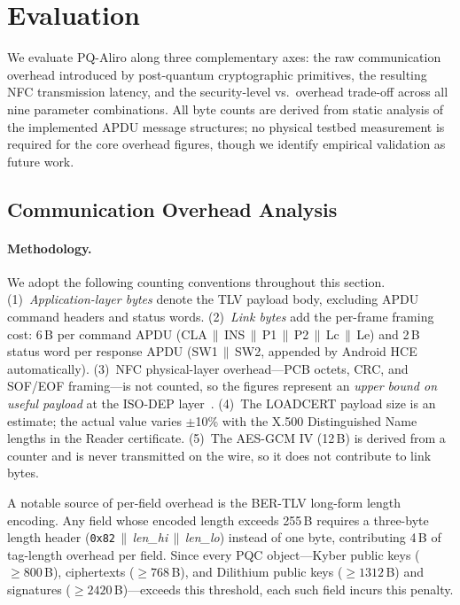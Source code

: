 \section{Evaluation}
\label{sec:evaluation}

We evaluate PQ-Aliro along three complementary axes: the raw communication
overhead introduced by post-quantum cryptographic primitives, the resulting
NFC transmission latency, and the security-level vs.\ overhead trade-off
across all nine parameter combinations.  All byte counts are derived from
static analysis of the implemented APDU message structures; no physical
testbed measurement is required for the core overhead figures, though we
identify empirical validation as future work.

\subsection{Communication Overhead Analysis}
\label{sec:eval:overhead}

\paragraph{Methodology.}
We adopt the following counting conventions throughout this section.
(1)~\emph{Application-layer bytes} denote the TLV payload body, excluding
APDU command headers and status words.
(2)~\emph{Link bytes} add the per-frame framing cost: 6\,B per command
APDU (CLA\,$\|$\,INS\,$\|$\,P1\,$\|$\,P2\,$\|$\,Lc\,$\|$\,Le) and 2\,B
status word per response APDU (SW1\,$\|$\,SW2, appended by Android HCE
automatically).
(3)~NFC physical-layer overhead—PCB octets, CRC, and SOF/EOF framing—is
not counted, so the figures represent an \emph{upper bound on useful
payload} at the ISO-DEP layer~\cite{CSA:Aliro10}.
(4)~The LOADCERT payload size is an estimate; the actual value varies
$\pm$10\% with the X.500 Distinguished Name lengths in the Reader
certificate.
(5)~The AES-GCM IV (12\,B) is derived from a counter and is never
transmitted on the wire, so it does not contribute to link bytes.

A notable source of per-field overhead is the BER-TLV long-form length
encoding.  Any field whose encoded length exceeds 255\,B requires a
three-byte length header (\texttt{0x82}\,$\|$\,\textit{len\_hi}\,$\|$\,\textit{len\_lo})
instead of one byte, contributing 4\,B of tag-length overhead per field.
Since every PQC object—Kyber public keys ($\ge 800$\,B), ciphertexts
($\ge 768$\,B), and Dilithium public keys ($\ge 1312$\,B) and signatures
($\ge 2420$\,B)—exceeds this threshold, each such field incurs this
penalty.

